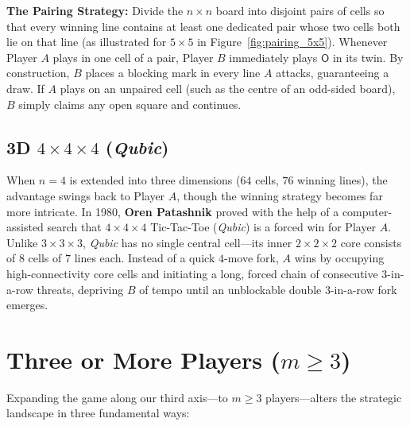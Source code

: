 \documentclass[11pt, a4paper]{article}
\begin{document}
\textbf{The Pairing Strategy:} Divide the $n \times n$ board into disjoint pairs of cells so that every winning line contains at least one dedicated pair whose two cells both lie on that line (as illustrated for $5 \times 5$ in Figure~\ref{fig:pairing_5x5}). Whenever Player $A$ plays in one cell of a pair, Player $B$ immediately plays $\mathsf{O}$ in its twin. By construction, $B$ places a blocking mark in every line $A$ attacks, guaranteeing a draw. If $A$ plays on an unpaired cell (such as the centre of an odd-sided board), $B$ simply claims any open square and continues.

\subsection{3D $4 \times 4 \times 4$ (\emph{Qubic})}
When $n = 4$ is extended into three dimensions ($64$ cells, $76$ winning lines), the advantage swings back to Player $A$, though the winning strategy becomes far more intricate. In 1980, \textbf{Oren Patashnik} proved with the help of a computer-assisted search that $4 \times 4 \times 4$ Tic-Tac-Toe (\emph{Qubic}) is a forced win for Player $A$. Unlike $3 \times 3 \times 3$, \emph{Qubic} has no single central cell—its inner $2 \times 2 \times 2$ core consists of $8$ cells of $7$ lines each. Instead of a quick $4$-move fork, $A$ wins by occupying high-connectivity core cells and initiating a long, forced chain of consecutive $3$-in-a-row threats, depriving $B$ of tempo until an unblockable double $3$-in-a-row fork emerges.

\section{Three or More Players ($m \ge 3$)}
Expanding the game along our third axis—to $m \ge 3$ players—alters the strategic landscape in three fundamental ways:
\end{document}
